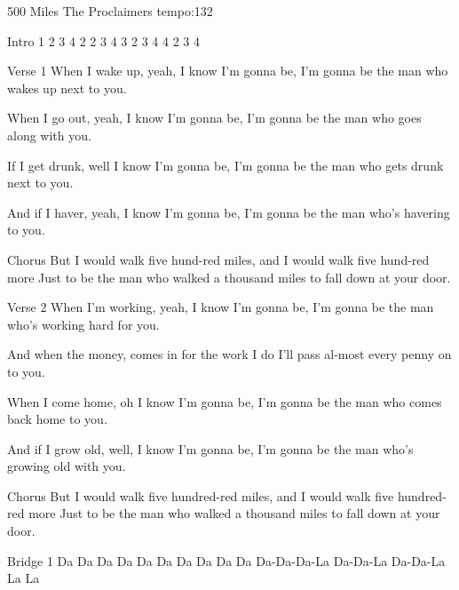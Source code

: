\begin{song}[]{500 Miles The Proclaimers}
    tempo:132
    
    Intro
     1 2 3 4     2 2 3 4     3 2 3 4     4 2 3 4
    
    Verse 1
    When I wake up, yeah, I know I'm gonna be,
    I'm gonna be the man who wakes up next to you.
    
    When I go out, yeah, I know I'm gonna be,
    I'm gonna be the man who goes along with you.
    
    If I get drunk, well I know I'm gonna be,
    I'm gonna be the man who gets drunk next to you.
    
    And if I haver, yeah, I know I'm gonna be,
    I'm gonna be the man who's havering to you.
    
    Chorus
    But I would walk  five hund-red miles, and
    I    would     walk    five hund-red    more
    Just to be the man who walked a thousand miles
    to fall down at your door.    
    
    
    Verse 2
    When I'm working, yeah, I know I'm gonna be,
    I'm gonna be the man who's working hard for you.
    
    And when the money,    comes in for the work I do
    I'll pass al-most every penny on to you.
    
    When I come home, oh I know I'm gonna be,
    I'm gonna be the man who comes back home to you.
    
    And if I grow old, well, I know I'm gonna be,
    I'm gonna be the man who's growing old with you.
    
    
    Chorus
    But I would walk five hundred-red miles, and
    I would walk five hundred-red more
    Just to be the man who walked a thousand miles
    to fall down at your door.    
    
    
    
    Bridge 1
    Da Da Da Da          Da Da Da Da      Da Da Da-Da-Da-La Da-Da-La Da-Da-La La La
    

\end{song}
